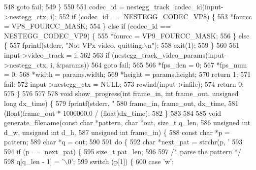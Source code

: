 \begin{DoxyCodeInclude}
{{{{{{{{{548       \textcolor{keywordflow}{goto} fail;
549   \}
550 
551   codec\_id = nestegg\_track\_codec\_id(input->nestegg\_ctx, i);
552   \textcolor{keywordflow}{if} (codec\_id == NESTEGG\_CODEC\_VP8) \{
553     *fourcc = VP8\_FOURCC\_MASK;
554   \} \textcolor{keywordflow}{else} \textcolor{keywordflow}{if} (codec\_id == NESTEGG\_CODEC\_VP9) \{
555     *fourcc = VP9\_FOURCC\_MASK;
556   \} \textcolor{keywordflow}{else} \{
557     fprintf(stderr, \textcolor{stringliteral}{"Not VPx video, quitting.\(\backslash\)n"});
558     exit(1);
559   \}
560 
561   input->video\_track = i;
562 
563   \textcolor{keywordflow}{if} (nestegg\_track\_video\_params(input->nestegg\_ctx, i, &params))
564     \textcolor{keywordflow}{goto} fail;
565 
566   *fps\_den = 0;
567   *fps\_num = 0;
568   *width = params.width;
569   *height = params.height;
570   \textcolor{keywordflow}{return} 1;
571 fail:
572   input->nestegg\_ctx = NULL;
573   rewind(input->infile);
574   \textcolor{keywordflow}{return} 0;
575 \}
576 
577 
578 \textcolor{keywordtype}{void} show\_progress(\textcolor{keywordtype}{int} frame\_in, \textcolor{keywordtype}{int} frame\_out, \textcolor{keywordtype}{unsigned} \textcolor{keywordtype}{long} dx\_time) \{
579   fprintf(stderr, \textcolor{stringliteral}{"%
580           frame\_in, frame\_out, dx\_time,
581           (\textcolor{keywordtype}{float})frame\_out * 1000000.0 / (\textcolor{keywordtype}{float})dx\_time);
582 \}
583 
584 
585 \textcolor{keywordtype}{void} generate\_filename(\textcolor{keyword}{const} \textcolor{keywordtype}{char} *pattern, \textcolor{keywordtype}{char} *out, \textcolor{keywordtype}{size\_t} q\_len,
586                        \textcolor{keywordtype}{unsigned} \textcolor{keywordtype}{int} d\_w, \textcolor{keywordtype}{unsigned} \textcolor{keywordtype}{int} d\_h,
587                        \textcolor{keywordtype}{unsigned} \textcolor{keywordtype}{int} frame\_in) \{
588   \textcolor{keyword}{const} \textcolor{keywordtype}{char} *p = pattern;
589   \textcolor{keywordtype}{char} *q = out;
590 
591   \textcolor{keywordflow}{do} \{
592     \textcolor{keywordtype}{char} *next\_pat = strchr(p, \textcolor{charliteral}{'%
593 
594     \textcolor{keywordflow}{if} (p == next\_pat) \{
595       \textcolor{keywordtype}{size\_t} pat\_len;
596 
597       \textcolor{comment}{/* parse the pattern */}
598       q[q\_len - 1] = \textcolor{charliteral}{'\(\backslash\)0'};
599       \textcolor{keywordflow}{switch} (p[1]) \{
600         \textcolor{keywordflow}{case} \textcolor{charliteral}{'w'}:
}}}}}}}}}}}
\end{DoxyCodeInclude}
